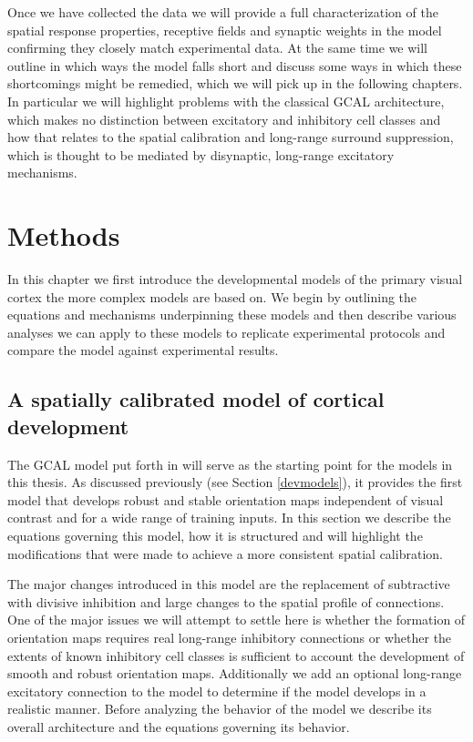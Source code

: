Once we have collected the data we will provide a full
characterization of the spatial response properties, receptive fields
and synaptic weights in the model confirming they closely match
experimental data. At the same time we will outline in which ways the
model falls short and discuss some ways in which these shortcomings
might be remedied, which we will pick up in the following chapters.
In particular we will highlight problems with the classical GCAL
architecture, which makes no distinction between excitatory and
inhibitory cell classes and how that relates to the spatial
calibration and long-range surround suppression, which is thought to
be mediated by disynaptic, long-range excitatory mechanisms.

\section{Methods}

In this chapter we first introduce the developmental models of the
primary visual cortex the more complex models are based on. We begin
by outlining the equations and mechanisms underpinning these models
and then describe various analyses we can apply to these models to
replicate experimental protocols and compare the model against
experimental results.

\subsection{A spatially calibrated model of cortical development} 

The GCAL model put forth in \cite{Stevens2013} will serve as the
starting point for the models in this thesis. As discussed previously
(see Section \ref{devmodels}), it provides the first model that
develops robust and stable orientation maps independent of visual
contrast and for a wide range of training inputs. In this section we
describe the equations governing this model, how it is structured and
will highlight the modifications that were made to achieve a more
consistent spatial calibration.

The major changes introduced in this model are the replacement of
subtractive with divisive inhibition and large changes to the spatial
profile of connections. One of the major issues we will attempt to
settle here is whether the formation of orientation maps requires real
long-range inhibitory connections or whether the extents of known
inhibitory cell classes is sufficient to account the development of
smooth and robust orientation maps. Additionally we add an optional
long-range excitatory connection to the model to determine if the
model develops in a realistic manner. Before analyzing the behavior of
the model we describe its overall architecture and the equations
governing its behavior.


